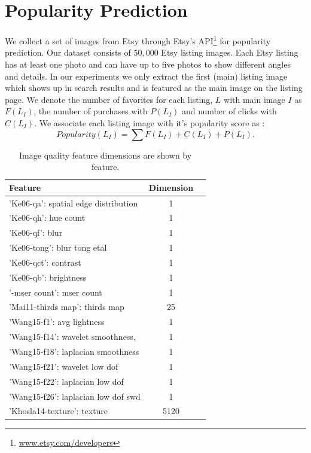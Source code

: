 \documentclass[conference,a4paper]{IEEEtran}
\begin{document}
\section{Popularity Prediction}
\label{sec:experiments}
We collect a set of images from Etsy through Etsy's API\footnote{\url{www.etsy.com/developers}} for popularity prediction.
Our dataset consists of $50,000$ Etsy listing images. Each Etsy listing has at least one photo and can have up to five photos to show different angles and details. In our experiments we only extract the first (main) listing image which shows up in search results and is featured as the main image on the listing page. We denote the number of favorites for each listing, $L$ with main image $I$ as $F(L_I)$, the number of purchases with $P(L_I)$ and number of clicks with $C(L_I)$. We associate each listing image with it's popularity score as :
$$Popularity(L_I) = \sum F(L_I) + C(L_I) + P(L_I).$$


\begin{table}
\label{tab:dimensions}
\begin{center}
\begin{tabular}{| l | c | c |}
\hline
Feature & Dimension \\ \hline
'Ke06-qa': spatial edge distribution & 1 \\ \hline
'Ke06-qh': hue count & 1 \\ \hline
'Ke06-qf': blur & 1 \\ \hline
'Ke06-tong': blur tong etal & 1 \\ \hline
'Ke06-qct': contrast & 1 \\ \hline
'Ke06-qb': brightness & 1 \\ \hline
'-mser count': mser count & 1 \\ \hline
'Mai11-thirds map': thirds map & 25 \\ \hline
'Wang15-f1': avg lightness & 1 \\ \hline
'Wang15-f14': wavelet smoothness, & 1 \\ \hline
'Wang15-f18': laplacian smoothness & 1 \\ \hline
'Wang15-f21': wavelet low dof & 1 \\ \hline
'Wang15-f22': laplacian low dof & 1 \\ \hline
'Wang15-f26': laplacian low dof swd & 1 \\ \hline
'Khosla14-texture': texture & 5120 \\ \hline
\hline
\end{tabular}
 \label{tab:dimensions}
\end{center}
\caption{Image quality feature dimensions are shown by feature.}
\label{tab:dimensions}
\end{table}
\end{document}
